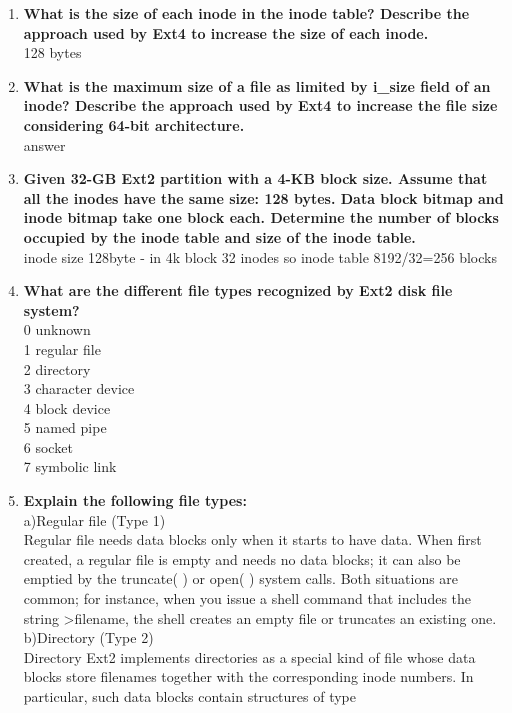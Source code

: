 \documentclass[a4paper,12pt]{article}
\begin{document}
\begin{flushleft}
\begin{enumerate}
\item \textbf{ What is the size of each inode in the inode table? Describe the approach used by Ext4 to increase the size of each inode.}\\
{\color{red}128 bytes}\\
\item \textbf{ What is the maximum size of a file as limited by i\_size field of an inode? Describe the approach used by Ext4 to increase the file size considering 64-bit architecture.}\\
{\color{red}answer}\\
\item \textbf{ Given 32-GB Ext2 partition with a 4-KB block size. Assume that all the inodes have the same size: 128 bytes. Data block bitmap and inode bitmap take one block each. Determine the number of blocks occupied by the inode table and size of the inode table.}\\
{\color{red}inode size 128byte - in 4k block 32 inodes so inode table  8192/32=256 blocks}\\
\item \textbf{ What are the different file types recognized by Ext2 disk file system?}\\
{\color{red}0 unknown\\1 regular file\\2 directory\\3 character device\\
4 block device\\5 named pipe\\6 socket\\7 symbolic link}\\
\item \textbf{ Explain the following file types:}\\
a)Regular file (Type 1) \\
{\color{red} Regular file needs data blocks only when it starts to have data. When first created, a regular file is empty and needs no data
blocks; it can also be emptied by the truncate( ) or open( ) system
calls.
 Both situations are common; for instance, when you issue a shell
command that includes the string >filename, the shell creates an
empty file or truncates an existing one.
}\\
b)Directory (Type 2) \\
{\color{red}Directory
 Ext2 implements directories as a special kind of file whose data
blocks store filenames together with the corresponding inode
numbers.
 In particular, such data blocks contain structures of type
}
\end{enumerate}
\end{flushleft}
\end{document}
